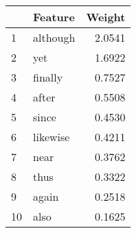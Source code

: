 \begin{tabular}{llr}
\toprule
{} &   Feature &  Weight \\
\midrule
1  &  although &  2.0541 \\
2  &       yet &  1.6922 \\
3  &   finally &  0.7527 \\
4  &     after &  0.5508 \\
5  &     since &  0.4530 \\
6  &  likewise &  0.4211 \\
7  &      near &  0.3762 \\
8  &      thus &  0.3322 \\
9  &     again &  0.2518 \\
10 &      also &  0.1625 \\
\bottomrule
\end{tabular}
